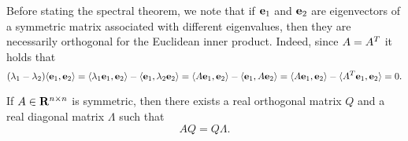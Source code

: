 Before stating the spectral theorem,
we note that if $\mathbf e_1$ and $\mathbf e_2$ are eigenvectors of a symmetric matrix associated with different eigenvalues,
then they are necessarily orthogonal for the Euclidean inner product.
Indeed, since $A = A^T$ it holds that
\[
    (\lambda_1 - \lambda_2) \langle\mathbf e_1, \mathbf e_2\rangle
    = \langle\lambda_1 \mathbf e_1, \mathbf e_2\rangle - \langle\mathbf e_1, \lambda_2 \mathbf e_2\rangle
    = \langle A \mathbf e_1, \mathbf e_2\rangle - \langle\mathbf e_1, A \mathbf e_2\rangle
    = \langle A \mathbf e_1, \mathbf e_2\rangle - \langle A^T \mathbf e_1, \mathbf e_2\rangle = 0.
\]
\begin{theorem}
    If $A \in \mathbf R^{n \times n}$ is symmetric,
    then there exists a real orthogonal matrix $Q$ and a real diagonal matrix $\Lambda$ such that
    \[
        A Q = Q \Lambda.
    \]
\end{theorem}
